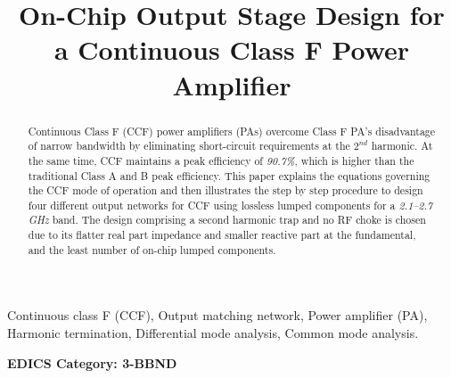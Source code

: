 \documentclass[conference]{IEEEtran}
\begin{document}
\title{On-Chip Output Stage Design for a  Continuous Class F Power Amplifier}

\author{ 
}

\maketitle

\begin{abstract}
Continuous Class F (CCF) power amplifiers (PAs) overcome Class F PA's disadvantage of narrow bandwidth by eliminating short-circuit requirements at the $2^{nd}$ harmonic. At the same time, CCF maintains a peak efficiency of \textit{90.7\%}, which is higher than the traditional Class A and B peak efficiency. This paper explains the equations governing the CCF mode of operation and then illustrates the step by step procedure to design  four different output networks for CCF using lossless lumped components for a \textit{2.1--2.7 GHz} band.
The design comprising a second harmonic trap and no RF choke is chosen \color{blue} due to its \color{black} flatter real part impedance \color{blue} and \color{black} smaller reactive part at the \color{blue} fundamental, \color{black} and  the least number of on-chip lumped components.
\end{abstract}

\vspace{1mm}
\begin{IEEEkeywords}
Continuous class F (CCF), Output matching network, Power amplifier (PA), Harmonic termination, Differential mode analysis, Common mode analysis. 
\end{IEEEkeywords}


\ifCLASSOPTIONpeerreview
\begin{center} \bfseries EDICS Category: 3-BBND \end{center}
\fi

\IEEEpeerreviewmaketitle
\end{document}

